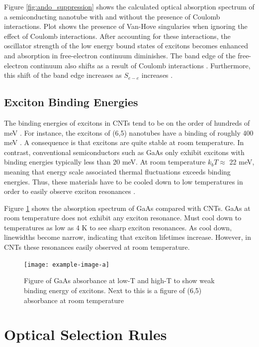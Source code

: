 Figure \ref{fig:ando_suppression} shows the calculated optical absorption spectrum of a semiconducting nanotube with and without the presence of Coulomb interactions. Plot shows the presence of Van-Hove singularies when ignoring the effect of Coulomb interactions. After accounting for these interactions, the oscillator strength of the low energy bound states of excitons becomes enhanced and absorption in free-electron continuum diminishes. The band edge of the free-electron continuum also shifts as a result of Coulomb interactions \cite{ando1997excitons}. Furthermore, this shift of the band edge increases as $S_{e-e}$ increases \cite{ando2005theory}. 

\subsection{Exciton Binding Energies}

The binding energies of excitons in CNTs tend to be on the order of hundreds of meV \cite{wang2005optical}. For instance, the excitons of (6,5) nanotubes have a binding of roughly 400 meV \cite{wang2005optical}. A consequence is that excitons are quite stable at room temperature. In contrast, conventional semiconductors such as GaAs only exhibit excitons with binding energies typically less than 20 meV. At room temperature $k_b T \approx$ 22 meV, meaning that energy scale associated thermal fluctuations exceeds binding energies. Thus, these materials have to be cooled down to low temperatures in order to easily observe exciton resonances \cite{liang1970excitons}. 

Figure \ref{fig:gaas_vs_cnt_absorbance} shows the absorption spectrum of GaAs compared with CNTs. GaAs at room temperature does not exhibit any exciton resonance. Must cool down to temperatures as low as 4 K to see sharp exciton resonances. As cool down, linewidths become narrow, indicating that exciton lifetimes increase. However, in CNTs these resonances easily observed at room temperature. 


\begin{figure}[h]
	\centering
	\texttt{[image: example-image-a]}
	\caption{Figure of GaAs absorbance at low-T and high-T to show weak binding energy of excitons. Next to this is a figure of  (6,5) absorbance at room temperature}
	\label{fig:gaas_vs_cnt_absorbance}
\end{figure}

\section{Optical Selection Rules}

